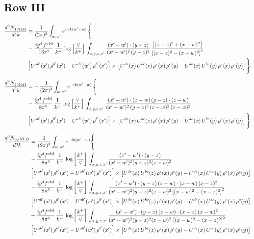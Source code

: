 \documentclass[9pt]{article}
\numberwithin{equation}{section}
\begin{document}
\subsection{Row III}
\begin{align}
   \frac{d^{3}N_{1\,\rm NLO}^{\rm}}{d^{3}k}  & = \frac{1}{(2\pi)^{3}}  \int_{w, w^\prime} e^{-ik(w^\prime-w)}\, \Bigg\{\notag \\ &   -\,\frac{ig^{4}\,f^{abd}}{16\pi^{5}}\,\frac{1}{k^{+}}\,\log{\left[\frac{\vee}{k^{+}}\right]} \,\int_{x,y,z,x'}\, \frac{(x'-w')\cdot (y-z)}{(x'-w')^{2}\,(y-z)^{2}}\,\frac{\left[(x-z)^{2}+(x-w)^{2}\right]}{\left[(x-z)^{2}-(x-w)^{2}\right]^{2}}\notag \\ & \left[U^{ab'}(x')\,\rho^{b'}(x')-U^{ab'}(w')\, \rho^{b'}(x')\right]\times\, \left[U^{de}(x)\,U^{bc}(z)\, \rho^{e}(x)\,\rho^{c}(y)-U^{de}(x)\,U^{bc}(y)\,\rho^{e}(x)\,\rho^{c}(y)\right]\Bigg\}
\end{align}
\begin{align}
   \frac{d^{3}N_{2\,\rm NLO}^{\rm}}{d^{3}k}  & = -\,\frac{1}{(2\pi)^{3}}  \int_{w, w^\prime} e^{-ik(w^\prime-w)}\, \Bigg\{\notag \\ &  -\frac{ig^{4}\, f^{abd}}{8\pi^{5}}\, \frac{1}{k^{+}}\, \log{\left[\frac{\vee}{ k^{+}}\right]}\,\int_{x,y,z,x'}\,\frac{(x'-w')\cdot (x-w)\, (y-z)\cdot (z-w)}{(x'-w')^{2}\, (y-z)^{2}\, (z-w)^{2}\,(x-w)^{2}}\, \notag \\ & \left[U^{ab'}(x')\,\rho^{b'}(x')-U^{ab'}(w')\, \rho^{b'}(x')\right]\times\,\left[U^{de}(x)\,U^{bc}(z)\, \rho^{e}(x)\,\rho^{c}(y)-U^{de}(x)\,U^{bc}(y)\,\rho^{e}(x)\,\rho^{c}(y)\right]\Bigg\} 
\end{align}   
\begin{align}
\frac{d^{3}N_{3a\,\rm NLO}}{d^{3}k} & =\frac{1}{(2\pi)^{3}}\int_{w,w'}e^{-ik(w'-w)}\Bigg\{\notag \\ &  -\frac{ig^{4}f^{abd}}{8\pi^{5}}\,\frac{1}{k^{+}}\, \log{\left[\frac{k^{+}}{\vee}\right]}\,\int_{x,y,z,x'}
\frac{(x'-w')\cdot(y-z)}{(x'-w')^{2}(y-z)^{2}(z-w)^{2}}\notag \\ & \left[U^{ab'}(x')\,\rho^{b'}(x')-U^{ab'}(w')\, \rho^{b'}(x')\right]\times \left[U^{de}(x)\,U^{bc}(z)\, \rho^{e}(x)\,\rho^{c}(y)-U^{de}(x)\,U^{bc}(y)\,\rho^{e}(x)\,\rho^{c}(y)\right]\notag \\ & -\frac{ig^{4}f^{abd}}{8\pi^{5}}\,\frac{1}{k^{+}}\, \log{\left[\frac{k^{+}}{\vee}\right]}\,\int_{x,y,z,x'}
\frac{(x'-w')\cdot(y-z)\,(z-w)\cdot(x-w)\,(x-z)^{2}}{(x'-w')^{2}(y-z)^{2}(z-w)^{2}\left[(x-w)^{2}-(x-z)^{2}\right]^{2}}\notag \\ & \left[U^{ab'}(x')\,\rho^{b'}(x')-U^{ab'}(w')\, \rho^{b'}(x')\right]\times \left[U^{de}(x)\,U^{bc}(z)\, \rho^{e}(x)\,\rho^{c}(y)-U^{de}(x)\,U^{bc}(y)\,\rho^{e}(x)\,\rho^{c}(y)\right]\notag \\ & +\frac{ig^{4}f^{abd}}{8\pi^{5}}\,\frac{1}{k^{+}}\, \log{\left[\frac{k^{+}}{\vee}\right]}\,\int_{x,y,z,x'}
\frac{(x'-w')\cdot(y-z)\,(z-w)\cdot(x-z)\,(x-w)^{2}}{(x'-w')^{2}(y-z)^{2}(z-w)^{2}\,\left[(x-w)^{2}-(x-z)^{2}\right]^{2}}\notag \\ & \left[U^{ab'}(x')\,\rho^{b'}(x')-U^{ab'}(w')\, \rho^{b'}(x')\right]\times \left[U^{de}(x)\,U^{bc}(z)\, \rho^{e}(x)\,\rho^{c}(y)-U^{de}(x)\,U^{bc}(y)\,\rho^{e}(x)\,\rho^{c}(y)\right]
\end{align}
\end{document}
